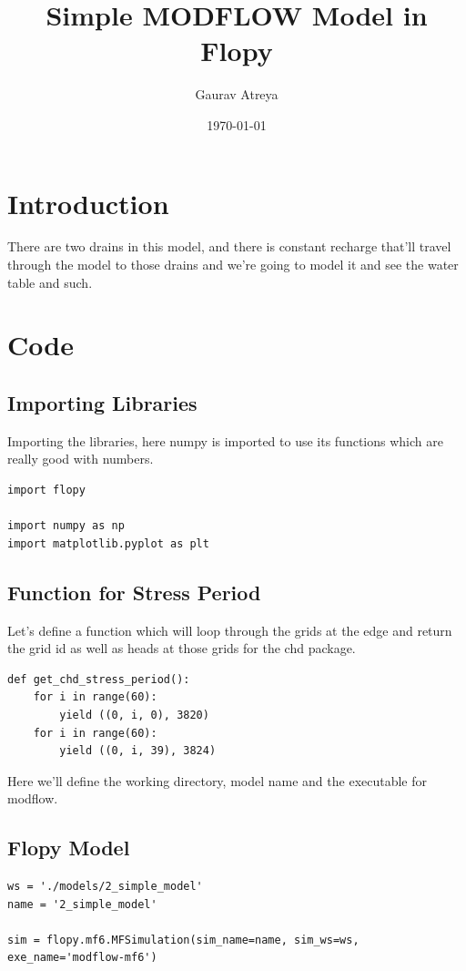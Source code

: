 \documentclass[titlepage,12pt]{unisubmission}
\author{Gaurav Atreya}
\date{\today}
\title{Simple MODFLOW Model in Flopy}
\begin{document}
\maketitle
\setcounter{tocdepth}{2}
\tableofcontents
\section{Introduction}
\label{sec:org59d187b}
There are two drains in this model, and there is constant recharge that'll travel through the model to those drains and we're going to model it and see the water table and such.


\section{Code}
\label{sec:org54c9b75}

\subsection{Importing Libraries}
\label{sec:org9927ece}
Importing the libraries, here numpy is imported to use its functions which are really good with numbers.

\begin{verbatim}
import flopy

import numpy as np
import matplotlib.pyplot as plt
\end{verbatim}

\subsection{Function for Stress Period}
\label{sec:org52b3262}
Let's define a function which will loop through the grids at the edge and return the grid id as well as heads at those grids for the chd package.

\begin{verbatim}
def get_chd_stress_period():
    for i in range(60):
        yield ((0, i, 0), 3820)
    for i in range(60):
        yield ((0, i, 39), 3824)
\end{verbatim}

Here we'll define the working directory, model name and the executable for modflow.

\subsection{Flopy Model}
\label{sec:orgcd97ef7}

\begin{verbatim}
ws = './models/2_simple_model'
name = '2_simple_model'

sim = flopy.mf6.MFSimulation(sim_name=name, sim_ws=ws, exe_name='modflow-mf6')
\end{verbatim}
\end{document}
